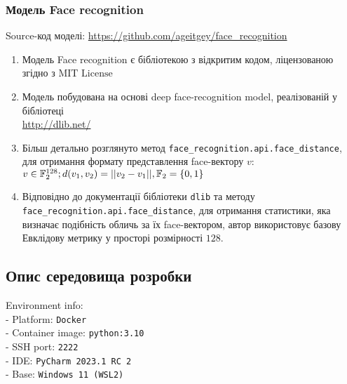\documentclass[11pt]{article}
\providecommand{\tightlist}{%
      \setlength{\itemsep}{0pt}\setlength{\parskip}{0pt}}
\begin{document}
    \hypertarget{ux43cux43eux434ux435ux43bux44c-face-recognition}{%
\subsubsection{Модель Face
recognition}\label{ux43cux43eux434ux435ux43bux44c-face-recognition}}

Source-код моделі: \url{https://github.com/ageitgey/face_recognition}

\begin{enumerate}
\def\labelenumi{\arabic{enumi}.}
\tightlist
\item
  Модель Face recognition є бібліотекою з відкритим кодом, ліцензованою
  згідно з \(\text{MIT License}\)
\item
  Модель побудована на основі deep face-recognition model, реалізованій
  у бібліотеці \\
  \url{http://dlib.net/}
\item
  Більш детально розглянуто метод
  \texttt{face\_recognition.api.face\_distance}, для отримання формату
  представлення face-вектору \(v\):
  \(v \in \mathbb{F}_2^{128}; \space d(v_1,v_2) = ||v_2-v_1||, \space \mathbb{F}_2 = \{0,1\}\)
\item
  Відповідно до документації бібліотеки \texttt{dlib} та методу\\
  \texttt{face\_recognition.api.face\_distance}, для отримання
  статистики, яка визначає подібність обличь за їх face-вектором, автор
  використовує базову Евклідову метрику у просторі розмірності \(128\).
\end{enumerate}

\vspace{20ex}

    \hypertarget{ux43eux43fux438ux441-ux441ux435ux440ux435ux434ux43eux432ux438ux449ux430-ux440ux43eux437ux440ux43eux431ux43aux438}{%
\subsection{Опис середовища
розробки}\label{ux43eux43fux438ux441-ux441ux435ux440ux435ux434ux43eux432ux438ux449ux430-ux440ux43eux437ux440ux43eux431ux43aux438}}

Environment info: \\
- Platform: \texttt{Docker} \\
- Container image: \texttt{python:3.10} \\
- SSH port: \texttt{2222} \\
- IDE: \texttt{PyCharm\ 2023.1\ RC\ 2} \\
- Base: \texttt{Windows\ 11\ (WSL2)}\\
\end{document}
